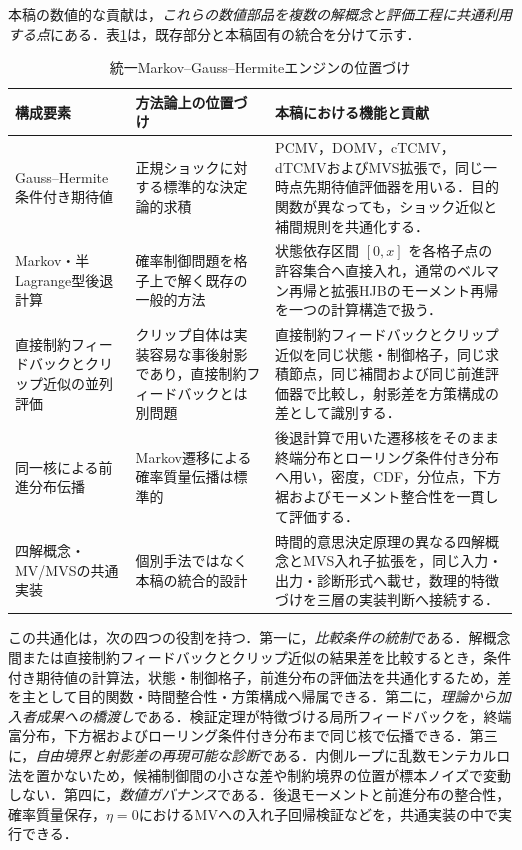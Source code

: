\documentclass[10pt,a4paper]{article}
\theoremstyle{plain}
\theoremstyle{definition}
\begin{document}
本稿の数値的な貢献は，\emph{これらの数値部品を複数の解概念と評価工程に共通利用する点}にある．表\ref{tab:gh-engine-positioning}は，既存部分と本稿固有の統合を分けて示す．

\begin{table}[htbp]
\centering\small
\caption{統一Markov--Gauss--Hermiteエンジンの位置づけ}
\label{tab:gh-engine-positioning}
\begin{tabularx}{\textwidth}{p{34mm}p{43mm}X}
\toprule
構成要素 & 方法論上の位置づけ & 本稿における機能と貢献 \\
\midrule
Gauss--Hermite条件付き期待値
& 正規ショックに対する標準的な決定論的求積
& PCMV，DOMV，cTCMV，dTCMVおよびMVS拡張で，同じ一時点先期待値評価器を用いる．目的関数が異なっても，ショック近似と補間規則を共通化する．\\
Markov・半Lagrange型後退計算
& 確率制御問題を格子上で解く既存の一般的方法
& 状態依存区間 $[0,x]$ を各格子点の許容集合へ直接入れ，通常のベルマン再帰と拡張HJBのモーメント再帰を一つの計算構造で扱う．\\
直接制約フィードバックとクリップ近似の並列評価
& クリップ自体は実装容易な事後射影であり，直接制約フィードバックとは別問題
& 直接制約フィードバックとクリップ近似を同じ状態・制御格子，同じ求積節点，同じ補間および同じ前進評価器で比較し，射影差を方策構成の差として識別する．\\
同一核による前進分布伝播
& Markov遷移による確率質量伝播は標準的
& 後退計算で用いた遷移核をそのまま終端分布とローリング条件付き分布へ用い，密度，CDF，分位点，下方裾およびモーメント整合性を一貫して評価する．\\
四解概念・MV/MVSの共通実装
& 個別手法ではなく本稿の統合的設計
& 時間的意思決定原理の異なる四解概念とMVS入れ子拡張を，同じ入力・出力・診断形式へ載せ，数理的特徴づけを三層の実装判断へ接続する．\\
\bottomrule
\end{tabularx}
\end{table}

この共通化は，次の四つの役割を持つ．第一に，\emph{比較条件の統制}である．解概念間または直接制約フィードバックとクリップ近似の結果差を比較するとき，条件付き期待値の計算法，状態・制御格子，前進分布の評価法を共通化するため，差を主として目的関数・時間整合性・方策構成へ帰属できる．第二に，\emph{理論から加入者成果への橋渡し}である．検証定理が特徴づける局所フィードバックを，終端富分布，下方裾およびローリング条件付き分布まで同じ核で伝播できる．第三に，\emph{自由境界と射影差の再現可能な診断}である．内側ループに乱数モンテカルロ法を置かないため，候補制御間の小さな差や制約境界の位置が標本ノイズで変動しない．第四に，\emph{数値ガバナンス}である．後退モーメントと前進分布の整合性，確率質量保存，$\eta=0$におけるMVへの入れ子回帰検証などを，共通実装の中で実行できる．
\end{document}
